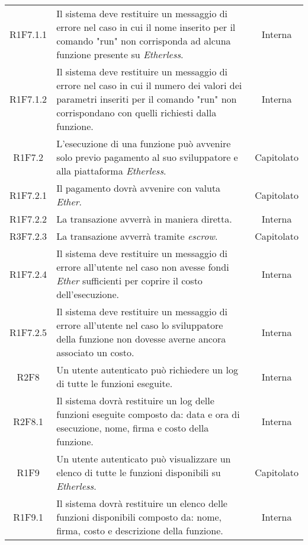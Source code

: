 \begin{longtable}{|c|p{8cm}|c|}
	R1F7.1.1 &  Il sistema deve restituire un messaggio di errore nel caso in cui il nome inserito per il comando "run" non corrisponda ad alcuna funzione presente su \textit{Etherless}.  & Interna \\
	
	R1F7.1.2 &  Il sistema deve restituire un messaggio di errore nel caso in cui il numero dei valori dei parametri inseriti per il comando "run" non corrispondano con quelli richiesti dalla funzione.  & Interna \\
		
	R1F7.2 &  L'esecuzione di una funzione può avvenire solo previo pagamento al suo sviluppatore e alla piattaforma \textit{Etherless}. & Capitolato \\
	
	R1F7.2.1 &  Il pagamento dovrà avvenire con valuta \textit{Ether\glos}. & Capitolato \\
	
	R1F7.2.2 &  La transazione avverrà in maniera diretta. & Interna \\
	
	R3F7.2.3 &  La transazione avverrà tramite \textit{escrow\glos}. & Capitolato \\
	
	R1F7.2.4 &  Il sistema deve restituire un messaggio di errore all'utente nel caso non avesse fondi  \textit{Ether\glos} sufficienti per coprire il costo dell'esecuzione. & Interna \\
	
	R1F7.2.5 &  Il sistema deve restituire un messaggio di errore all'utente nel caso lo sviluppatore della funzione non dovesse averne ancora associato un costo. & Interna \\
	
	R2F8 &  Un utente autenticato può richiedere un log di tutte le funzioni eseguite. & Interna \\	
	
	R2F8.1 &  Il sistema dovrà restituire un log delle funzioni eseguite composto da: data e ora di esecuzione, nome, firma e costo della funzione. & Interna \\
	
	R1F9 &  Un utente autenticato può visualizzare un elenco di tutte le funzioni disponibili su \textit{Etherless}. & Capitolato \\	
	
	R1F9.1 &  Il sistema dovrà restituire un elenco delle funzioni disponibili composto da: nome, firma, costo e descrizione della funzione. & Interna \\
	

\end{longtable}
